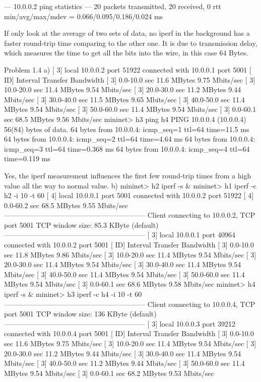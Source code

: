 						--- 10.0.0.2 ping statistics ---
						20 packets transmitted, 20 received, 0%
						rtt min/avg/max/mdev = 0.066/0.095/0.186/0.024 ms

						If only look at the average of two sets of data, no iperf in the background has a faster round-trip time comparing to the other one. It is due to transmission delay, which measures the time to get all the bits into the wire, in this case 64 Bytes.

Problem 1.4
					a)
							[  3] local 10.0.0.2 port 51922 connected with 10.0.0.1 port 5001
							[ ID] Interval       Transfer     Bandwidth
							[  3]  0.0-10.0 sec  11.6 MBytes  9.75 Mbits/sec
							[  3] 10.0-20.0 sec  11.4 MBytes  9.54 Mbits/sec
							[  3] 20.0-30.0 sec  11.2 MBytes  9.44 Mbits/sec
							[  3] 30.0-40.0 sec  11.5 MBytes  9.65 Mbits/sec
							[  3] 40.0-50.0 sec  11.4 MBytes  9.54 Mbits/sec
							[  3] 50.0-60.0 sec  11.4 MBytes  9.54 Mbits/sec
							[  3]  0.0-60.1 sec  68.5 MBytes  9.56 Mbits/sec
							mininet> h3 ping h4
							PING 10.0.0.4 (10.0.0.4) 56(84) bytes of data.
							64 bytes from 10.0.0.4: icmp_seq=1 ttl=64 time=11.5 ms
							64 bytes from 10.0.0.4: icmp_seq=2 ttl=64 time=4.64 ms
							64 bytes from 10.0.0.4: icmp_seq=3 ttl=64 time=0.368 ms
							64 bytes from 10.0.0.4: icmp_seq=4 ttl=64 time=0.119 ms

						Yes, the iperf measurement influences the first few round-trip times from a high value all the way to normal value.
					b)
						mininet> h2 iperf -s &
						mininet> h1 iperf -c h2 -i 10 -t 60
						[  4] local 10.0.0.1 port 5001 connected with 10.0.0.2 port 51922
						[  4]  0.0-60.2 sec  68.5 MBytes  9.55 Mbits/sec
						------------------------------------------------------------
						Client connecting to 10.0.0.2, TCP port 5001
						TCP window size: 85.3 KByte (default)
						------------------------------------------------------------
						[  3] local 10.0.0.1 port 40964 connected with 10.0.0.2 port 5001
						[ ID] Interval       Transfer     Bandwidth
						[  3]  0.0-10.0 sec  11.8 MBytes  9.86 Mbits/sec
						[  3] 10.0-20.0 sec  11.4 MBytes  9.54 Mbits/sec
						[  3] 20.0-30.0 sec  11.4 MBytes  9.54 Mbits/sec
						[  3] 30.0-40.0 sec  11.4 MBytes  9.54 Mbits/sec
						[  3] 40.0-50.0 sec  11.4 MBytes  9.54 Mbits/sec
						[  3] 50.0-60.0 sec  11.4 MBytes  9.54 Mbits/sec
						[  3]  0.0-60.1 sec  68.6 MBytes  9.58 Mbits/sec
						mininet> h4 iperf -s &
						mininet> h3 iperf -c h4 -i 10 -t 60
						------------------------------------------------------------
						Client connecting to 10.0.0.4, TCP port 5001
						TCP window size:  136 KByte (default)
						------------------------------------------------------------
						[  3] local 10.0.0.3 port 39212 connected with 10.0.0.4 port 5001
						[ ID] Interval       Transfer     Bandwidth
						[  3]  0.0-10.0 sec  11.6 MBytes  9.75 Mbits/sec
						[  3] 10.0-20.0 sec  11.4 MBytes  9.54 Mbits/sec
						[  3] 20.0-30.0 sec  11.2 MBytes  9.44 Mbits/sec
						[  3] 30.0-40.0 sec  11.4 MBytes  9.54 Mbits/sec
						[  3] 40.0-50.0 sec  11.2 MBytes  9.44 Mbits/sec
						[  3] 50.0-60.0 sec  11.4 MBytes  9.54 Mbits/sec
						[  3]  0.0-60.1 sec  68.2 MBytes  9.53 Mbits/sec

